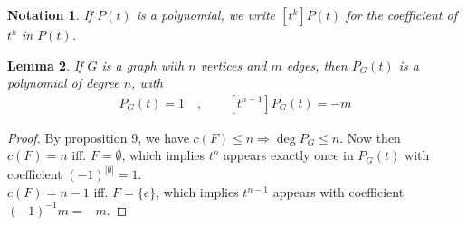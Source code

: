 \documentclass[a4paper]{article}
\theoremstyle{plain}
\newtheorem{lemma}{Lemma}
\newtheorem{notation}[lemma]{Notation}
\theoremstyle{myremark}
\begin{document}
\begin{notation}
If $P(t)$ is a polynomial, we write $[t^k]P(t)$ for the coefficient of $t^k$ in $P(t)$.
\end{notation}
\begin{lemma}
If $G$ is a graph with $n$ vertices and $m$ edges, then $P_G(t)$ is a polynomial of degree $n$, with
\begin{align*}
[t^n]P_G(t)=1\quad , \qquad [t^{n-1}]P_G(t)=-m
\end{align*}
\end{lemma}
\begin{proof}
By proposition 9, we have $c(F)\le n \Rightarrow \deg P_G \le n$. Now then $c(F)=n $ iff. $F=\emptyset$, which implies $t^n$ appears exactly once in $P_G(t)$ with coefficient $(-1)^{|\emptyset|}=1$.\\
$c(F)=n-1$ iff. $F=\lbrace e\rbrace$, which implies $t^{n-1}$ appears with coefficient $(-1)^{-1}m=-m$.
\end{proof}
\end{document}
